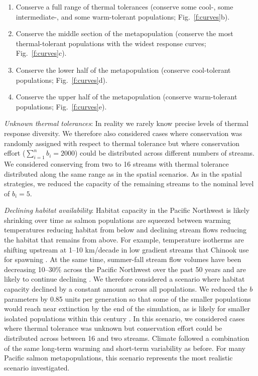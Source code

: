 \documentclass[12pt,english]{article}
\begin{document}
\begin{spacing}{1.3}
\begin{enumerate}
\def\labelenumi{\arabic{enumi}.}
\item
  Conserve a full range of thermal tolerances (conserve some cool-, some intermediate-, and some warm-tolerant populations; Fig.~\ref{f:curves}b).
\item
  Conserve the middle section of the metapopulation (conserve the most thermal-tolerant populations with the widest response curves; Fig.~\ref{f:curves}c).
\item
  Conserve the lower half of the metapopulation (conserve cool-tolerant populations; Fig.~\ref{f:curves}d).
\item
  Conserve the upper half of the metapopulation (conserve warm-tolerant populations; Fig.~\ref{f:curves}e).
\end{enumerate}

\emph{Unknown thermal tolerances}: In reality we rarely know precise levels of thermal response diversity. We therefore also considered cases where conservation was randomly assigned with respect to thermal tolerance but where conservation effort ($\sum\limits_{i=1}^n b_i = 2000$) could be distributed across different numbers of streams. We considered conserving from two to 16 streams with thermal tolerance distributed along the same range as in the spatial scenarios. As in the spatial strategies, we reduced the capacity of the remaining streams to the nominal level of $b_i = 5$.

\emph{Declining habitat availability}: Habitat capacity in the Pacific Northwest is likely shrinking over time as salmon populations are squeezed between warming temperatures reducing habitat from below and declining stream flows reducing the habitat that remains from above. For example, temperature isotherms are shifting upstream at 1--10 km/decade in low gradient streams that Chinook use for spawning \citep{isaak2013}. At the same time, summer-fall stream flow volumes have been decreasing 10--30\% across the Pacific Northwest over the past 50 years \citep{luce2009} and are likely to continue declining \citep{luce2013}. We therefore considered a scenario where habitat capacity declined by a constant amount across all populations. We reduced the $b$ parameters by 0.85 units per generation so that some of the smaller populations would reach near extinction by the end of the simulation, as is likely for smaller isolated populations within this century \citep[e.g.][]{gustafson2007}. In this scenario, we considered cases where thermal tolerance was unknown but conservation effort could be distributed across between 16 and two streams. Climate followed a combination of the same long-term warming and short-term variability as before. For many Pacific salmon metapopulations, this scenario represents the most realistic scenario investigated.


\end{spacing}
\end{document}
